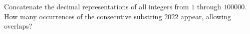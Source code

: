 Concatenate the decimal representations of all integers from $1$ through $100000$. How many occurrences of the consecutive substring $2022$ appear, allowing overlaps?
